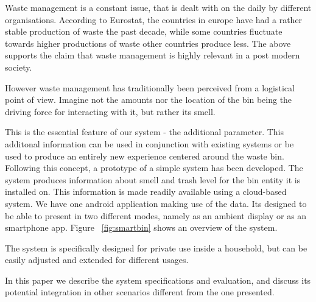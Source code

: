 Waste management is a constant issue, that is dealt with on the daily by different organisations.
According to Eurostat, the countries in europe have had a rather stable production of waste the past decade, while some countries fluctuate towards higher productions of waste other countries produce less. 
The above supports the claim that waste management is highly relevant in a post modern society.

However waste management has traditionally been perceived from a logistical point of view.
Imagine not the amounts nor the location of the bin being the driving force for interacting with it, but rather its smell.

This is the essential feature of our system - the additional parameter.
This additonal information can be used in conjunction with existing systems or be used to produce an entirely new experience centered around the waste bin.
Following this concept, a prototype of a simple system has been developed.
The system produces information about smell and trash level for the bin entity it is installed on.
This information is made readily available using a cloud-based system. 
We have one android application making use of the data. Its designed to be able to present in two different modes, namely as an ambient display or as an smartphone app.
Figure ~\ref{fig:smartbin} shows an overview of the system.

The system is specifically designed for private use inside a household, but can be easily adjusted and extended for different usages.

In this paper we describe the system specifications and evaluation, and discuss its potential integration in other scenarios different from the one presented.

